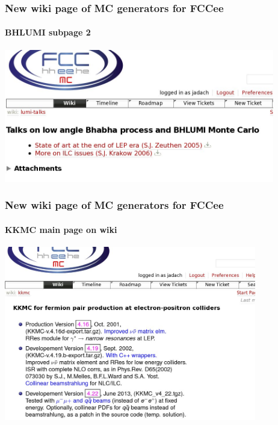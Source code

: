 \documentclass{beamer}
\begin{document}
\begin{frame}[fragile]
\frametitle{\bf New wiki page of MC generators for FCCee}
\framesubtitle{\bf BHLUMI subpage 2}

\includegraphics[width=118mm]{./wiki3.jpg}

\end{frame}

\begin{frame}[fragile]
\frametitle{\bf New wiki page of MC generators for FCCee}
\framesubtitle{\bf KKMC main page on wiki}

\includegraphics[width=110mm]{./wiki0k.jpg}

\end{frame}
\end{document}
